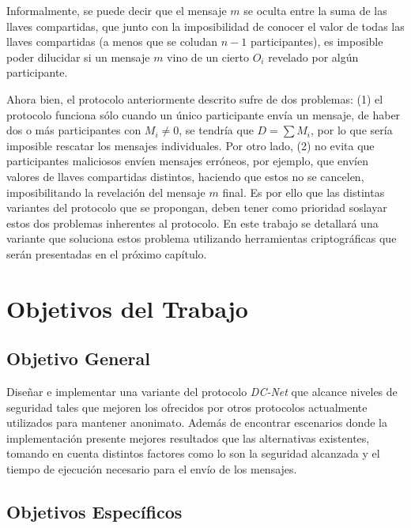 Informalmente, se puede decir que el mensaje $m$ se oculta entre la suma de las llaves compartidas, que junto con la imposibilidad de conocer el 
valor de todas las llaves compartidas (a menos que se coludan $n-1$ participantes), es imposible poder dilucidar si un mensaje $m$ vino de un 
cierto $O_i$ revelado por algún participante.

Ahora bien, el protocolo anteriormente descrito sufre de dos problemas: (1) el protocolo funciona sólo cuando un 
único participante envía un mensaje, de haber dos o más participantes con $M_i \neq 0$, se tendría que $D = \sum M_i$, por lo que sería imposible 
rescatar los mensajes individuales. Por otro lado, (2) no evita que participantes maliciosos envíen mensajes erróneos, por ejemplo, que envíen 
valores de llaves compartidas distintos, haciendo que estos no se cancelen, imposibilitando la revelación del mensaje $m$ final. Es por ello que 
las distintas variantes del protocolo que se propongan, deben tener como prioridad soslayar estos dos problemas inherentes al protocolo. En este 
trabajo se detallará una variante que soluciona estos problema utilizando herramientas criptográficas que serán presentadas en el próximo capítulo.

\section{Objetivos del Trabajo}

\subsection{Objetivo General}

Diseñar e implementar una variante del protocolo \emph{DC-Net} que alcance niveles de seguridad tales que mejoren los ofrecidos por otros protocolos 
actualmente utilizados para mantener anonimato. Además de encontrar escenarios donde la implementación presente mejores resultados que las 
alternativas existentes, tomando en cuenta distintos factores como lo son la seguridad alcanzada y el tiempo de ejecución necesario para el envío de los mensajes.

\subsection{Objetivos Específicos}

